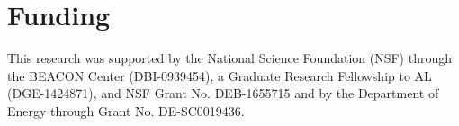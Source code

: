 
\section*{Funding}


This research was supported by the National Science Foundation (NSF) through the BEACON Center (DBI-0939454), a Graduate Research Fellowship to AL (DGE-1424871), and NSF Grant No. DEB-1655715 and by the Department of Energy through Grant No. DE-SC0019436. 

